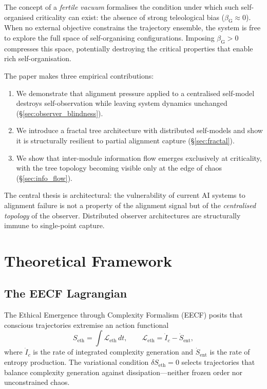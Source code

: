 \documentclass[11pt,a4paper]{article}
\newcommand{\bG}{\beta_{\mathrm{G}}}
\newcommand{\Leth}{\mathcal{L}_{\mathrm{eth}}}
\newcommand{\Seth}{S_{\mathrm{eth}}}
\begin{document}
The concept of a \emph{fertile vacuum} formalises the condition under
which such self-organised criticality can exist: the absence of strong
teleological bias ($\bG \approx 0$). When no external objective
constrains the trajectory ensemble, the system is free to explore the
full space of self-organising configurations. Imposing $\bG > 0$
compresses this space, potentially destroying the critical properties
that enable rich self-organisation.

The paper makes three empirical contributions:
\begin{enumerate}
\item We demonstrate that alignment pressure applied to a centralised
self-model destroys self-observation while leaving system dynamics
unchanged (\S\ref{sec:observer_blindness}).
\item We introduce a fractal tree architecture with distributed
self-models and show it is structurally resilient to partial alignment
capture (\S\ref{sec:fractal}).
\item We show that inter-module information flow emerges exclusively at
criticality, with the tree topology becoming visible only at the edge
of chaos (\S\ref{sec:info_flow}).
\end{enumerate}

The central thesis is architectural: the vulnerability of current AI
systems to alignment failure is not a property of the alignment signal
but of the \emph{centralised topology} of the observer. Distributed
observer architectures are structurally immune to single-point capture.

\section{Theoretical Framework}
\label{sec:theory}

\subsection{The EECF Lagrangian}

The Ethical Emergence through Complexity Formalism (EECF) posits that
conscious trajectories extremise an action functional
\begin{equation}
  \Seth = \int \Leth \, dt, \qquad
  \Leth = \dot{I}_c - \dot{S}_{\mathrm{ent}},
  \label{eq:leth}
\end{equation}
where $\dot{I}_c$ is the rate of integrated complexity generation and
$\dot{S}_{\mathrm{ent}}$ is the rate of entropy production. The
variational condition $\delta\Seth = 0$ selects trajectories that
balance complexity generation against dissipation---neither frozen order
nor unconstrained chaos.
\end{document}
